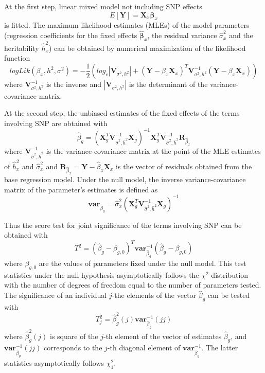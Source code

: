 \documentclass[12pt,a4paper]{article}
\begin{document}
At the first step, linear mixed model not including SNP effects
$$
E[\mathbf{Y}] = \mathbf{X}_x \mathbf{\beta}_x
$$
is fitted. The maximum likelihood estimates (MLEs) of the model parameters (regression coefficients for 
the fixed effects $\hat{\mathbf{\beta}}_x$, the
residual variance $\hat{\sigma}^2_x$ and the heritability $\hat{h}^2_x$) can 
be obtained by numerical maximization of the likelihood function
$$
logLik(\beta_x,h^2,\sigma^2) = -\frac{1}{2} ( log_e|\mathbf{V}_{\sigma^2,h^2}|+
(\mathbf{Y} - \beta_x \mathbf{X}_x)^T \mathbf{V}_{\sigma^2,h^2}^{-1} (\mathbf{Y} - \beta_x \mathbf{X}_x) )
$$
where $\mathbf{V}_{\sigma^2,h^2}^{-1}$ is the inverse and 
$|\mathbf{V}_{\sigma^2,h^2}|$ is the determinant of the variance-covariance matrix. 

At the second step, the unbiased estimates of the fixed effects of the terms 
involving SNP are obtained with 
$$
\hat{\beta}_g = (\mathbf{X}^T_g \mathbf{V}^{-1}_{\hat{\sigma}^2,\hat{h}^2} \mathbf{X}_g)^{-1} 
		\mathbf{X}^T_g \mathbf{V}^{-1}_{\hat{\sigma}^2,\hat{h}^2} \mathbf{R}_{\hat{\beta}_x}
$$
where $\mathbf{V}^{-1}_{\hat{\sigma}^2,\hat{h}^2}$ is the variance-covariance matrix at the point 
of the MLE estimates of $\hat{h}^2_x$ and $\hat{\sigma}^2_x$ and 
$\mathbf{R}_{\hat{\beta}_x} = \mathbf{Y} - \hat{\beta}_x \mathbf{X}_x$ is the 
vector of residuals obtained from the base regression model. Under the null 
model, the inverse variance-covariance matrix of the parameter's estimates is defined 
as
$$
\mathbf{var}_{\hat{\beta}_g} = \hat{\sigma}^2_x (\mathbf{X}^T_g \mathbf{V}^{-1}_{\hat{\sigma}^2,\hat{h}^2} \mathbf{X}_g)^{-1}
$$

Thus the score test for joint significance of the terms involving SNP can be obtained with 
$$
T^2 = (\hat{\beta}_g - \beta_{g,0})^T \mathbf{var}_{\hat{\beta}_g}^{-1} (\hat{\beta}_g - \beta_{g,0})
$$
where $\beta_{g,0}$ are the values of parameters fixed under the null model. 
This test statistics under the null hypothesis asymptotically follows the 
$\chi^2$ distribution with the number of degrees 
of freedom equal to the number of parameters tested. 
The significance of an individual $j$-the elements of the vector $\hat{\beta}_g$ can be tested with
$$
T^2_j = \hat{\beta}_{g}^2(j) \mathbf{var}_{\hat{\beta}_g}^{-1}(jj)
$$
where $\hat{\beta}_{g}^2(j)$ is square of the $j$-th element of the vector of estimates $\hat{\beta}_{g}$, 
and $\mathbf{var}_{\hat{\beta}_g}^{-1}(jj)$ corresponds to the $j$-th diagonal element of 
$\mathbf{var}_{\hat{\beta}_g}^{-1}$.
The latter statistics asymptotically follows $\chi^2_1$.
\end{document}

